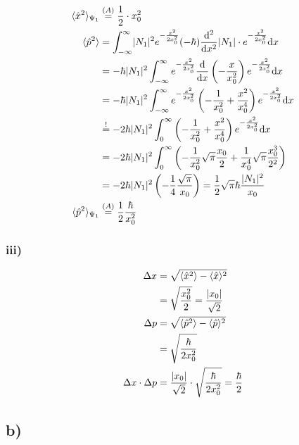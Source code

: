 \begin{align*}
        \langle \hat{x}^2 \rangle_{\Psi_1} &\stackrel{(A)}{=} \frac{1}{2} \cdot x_0^2\\
        \langle \hat{p}^2 \rangle &= \int_{-\infty}^{\infty} \lvert N_1\rvert^2 e^{- \frac{x^2}{2x_0^2}} (-\hbar) \frac{\mathrm{d}^2}{\mathrm{d}x^2} 
        \lvert N_1\rvert \cdot e^{- \frac{x^2}{2x_0^2}} \mathrm{d}x\\
        &= - \hbar \lvert N_1\rvert^2 \int_{-\infty}^{\infty} e^{- \frac{x^2}{2x_0^2}} \frac{\mathrm{d}}{\mathrm{d}x} \left( -\frac{x}{x_0^2} 
        \right) e^{- \frac{x^2}{2x_0^2}} \mathrm{d}x \nonumber\\
        &= - \hbar \lvert N_1\rvert^2 \int_{-\infty}^{\infty} e^{- \frac{x^2}{2x_0^2}} \left( -\frac{1}{x_0^2} + \frac{x^2}{x_0^4} \right) 
        e^{- \frac{x^2}{2x_0^2}} \mathrm{d}x \nonumber\\
        &\stackrel{!}{=} -2 \hbar \lvert N_1\rvert^2 \int_{0}^{\infty} \left( -\frac{1}{x_0^2} + \frac{x^2}{x_0^4} \right) e^{- \frac{x^2}{2x_0^2}}
        \mathrm{d}x \nonumber\\
        &= -2 \hbar \lvert N_1\rvert^2 \int_{0}^{\infty} \left( -\frac{1}{x_0^2} \sqrt{\pi} \frac{x_0}{2} + \frac{1}{x_0^4} \sqrt{\pi} \frac{x_0^3}{2^2}
        \right) \nonumber\\
        &= -2 \hbar \lvert N_1\rvert^2 \left( -\frac{1}{4} \frac{\sqrt{\pi}}{x_0} \right) = \frac{1}{2} \sqrt{\pi} \hbar \frac{\lvert N_1\rvert^2}{x_0} \nonumber\\
        \langle \hat{p}^2 \rangle_{\Psi_1} &\stackrel{(A)}{=} \frac{1}{2} \frac{\hbar}{x_0^2}
    \end{align*}

\subsubsection{iii)}

    \begin{align*}
        \Delta x &= \sqrt{\langle \hat{x}^2 \rangle - \langle \hat{x} \rangle^2}\\
        &= \sqrt{\frac{x_0^2}{2}} = \frac{\lvert x_0\rvert}{\sqrt{2}}\\
        \Delta p &= \sqrt{\langle \hat{p}^2 \rangle - \langle \hat{p} \rangle^2}\\
        &= \sqrt{\frac{\hbar}{2 x_0^2}}\\
        \Delta x \cdot \Delta p &= \frac{\lvert x_0\rvert}{\sqrt{2}} \cdot \sqrt{\frac{\hbar}{2 x_0^2}}
        = \frac{\hbar}{2}
    \end{align*}

\subsection{b)}

